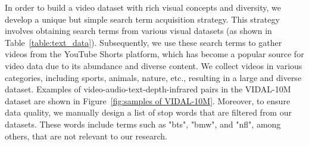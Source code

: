 \documentclass{article} \usepackage{iclr2024_conference,times}
\begin{document}
In order to build a video dataset with rich visual concepts and diversity, we develop a unique but simple search term acquisition strategy. This strategy involves obtaining search terms from various visual datasets (as shown in Table~\ref{table:text_data}). Subsequently, we use these search terms to gather videos from the YouTube Shorts platform, which has become a popular source for video data due to its abundance and diverse content. We collect videos in various categories, including sports, animals, nature, etc., resulting in a large and diverse dataset. Examples of video-audio-text-depth-infrared pairs in the VIDAL-10M dataset are shown in Figure~\ref{fig:samples of VIDAL-10M}. Moreover, to ensure data quality, we manually design a list of stop words that are filtered from our datasets. These words include terms such as "bts", "bmw", and "nfl", among others, that are not relevant to our research.
\end{document}
